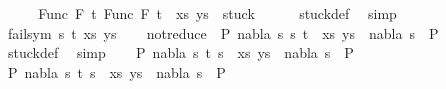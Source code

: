 \begin{isabellebody}
\ \ \isamarkupfalse%
\ \isamarkupfalse%
\ {\isachardoublequoteopen}{\isacharparenleft}{\kern0pt}{\isacharparenleft}{\kern0pt}Func\ F{}\ t{}{\isacharcomma}{\kern0pt}\ Func\ F{}\ t{}{\isacharparenright}{\kern0pt}\ {\isacharhash}{\kern0pt}\ xs{\isacharcomma}{\kern0pt}\ ys{\isacharparenright}{\kern0pt}\ {\isasymin}\ stuck{\isachardoublequoteclose}\isanewline
\ \ \ \ \isamarkupfalse%
\ stuck{\isacharunderscore}{\kern0pt}def\ \isamarkupfalse%
\ simp\isanewline
{}\isamarkupfalse%
\isanewline
\ \ \isamarkupfalse%
\ {\isacharparenleft}{\kern0pt}fail{\isacharunderscore}{\kern0pt}sym\ s\ t\ xs\ ys{\isacharparenright}{\kern0pt}\isanewline
\ \ \isamarkupfalse%
\ not{\isacharunderscore}{\kern0pt}reduce{\isacharcolon}{\kern0pt}\ {\isachardoublequoteopen}{\isasymnexists}\ P{}\ nabla\ s{}{\isachardot}{\kern0pt}\ {\isacharparenleft}{\kern0pt}{\isacharparenleft}{\kern0pt}s{\isacharcomma}{\kern0pt}\ t{\isacharparenright}{\kern0pt}\ {\isacharhash}{\kern0pt}\ xs{\isacharcomma}{\kern0pt}\ ys{\isacharparenright}{\kern0pt}\ {\isasymTurnstile}\ {\isacharparenleft}{\kern0pt}nabla{\isacharcomma}{\kern0pt}\ s{}{\isacharparenright}{\kern0pt}\ {\isasymRightarrow}\ P{}{\isachardoublequoteclose}\isanewline
\ \ \ \ \isamarkupfalse%
\ stuck{\isacharunderscore}{\kern0pt}def\ \isamarkupfalse%
\ simp\isanewline
\ \ \isamarkupfalse%
{\isachardoublequoteopen}{\isasymnexists}\ P{}\ nabla\ s{}{\isachardot}{\kern0pt}\ {\isacharparenleft}{\kern0pt}{\isacharparenleft}{\kern0pt}t{\isacharcomma}{\kern0pt}\ s{\isacharparenright}{\kern0pt}\ {\isacharhash}{\kern0pt}\ xs{\isacharcomma}{\kern0pt}\ ys{\isacharparenright}{\kern0pt}\ {\isasymTurnstile}\ {\isacharparenleft}{\kern0pt}nabla{\isacharcomma}{\kern0pt}\ s{}{\isacharparenright}{\kern0pt}\ {\isasymRightarrow}\ P{}{\isachardoublequoteclose}\isanewline
\ \ \isamarkupfalse%
\isanewline
\ \ \ \ \isamarkupfalse%
\ {\isachardoublequoteopen}{\isasymexists}P{}\ nabla\ s{}{\isachardot}{\kern0pt}\ {\isacharparenleft}{\kern0pt}{\isacharparenleft}{\kern0pt}t{\isacharcomma}{\kern0pt}\ s{\isacharparenright}{\kern0pt}\ {\isacharhash}{\kern0pt}\ xs{\isacharcomma}{\kern0pt}\ ys{\isacharparenright}{\kern0pt}\ {\isasymTurnstile}\ {\isacharparenleft}{\kern0pt}nabla{\isacharcomma}{\kern0pt}\ s{}{\isacharparenright}{\kern0pt}\ {\isasymRightarrow}\ P{}{\isachardoublequoteclose}\isanewline

\end{isabellebody}
